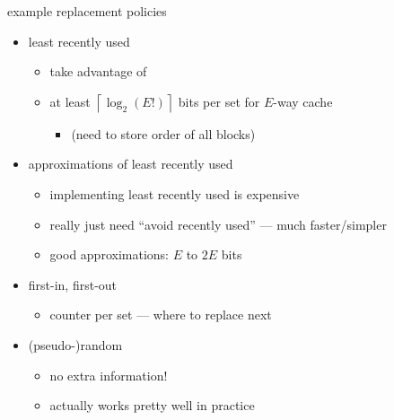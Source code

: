 \begin{frame}{example replacement policies}
\begin{itemize}
    \item least recently used
        \begin{itemize}
        \item take advantage of 
        \item at least $\left\lceil\log_2(E!)\right\rceil$ bits per set for $E$-way cache
            \begin{itemize}
            \item (need to store order of all blocks)
            \end{itemize}
        \end{itemize}
    \item approximations of least recently used
        \begin{itemize}
        \item implementing least recently used is expensive 
        \item really just need ``avoid recently used'' --- much faster/simpler
        \item good approximations: $E$ to $2E$ bits
        \end{itemize}
    \item first-in, first-out
        \begin{itemize}
        \item counter per set --- where to replace next
        \end{itemize}
    \item (pseudo-)random
        \begin{itemize}
        \item no extra information!
        \item actually works pretty well in practice
        \end{itemize}
\end{itemize}
\end{frame}

